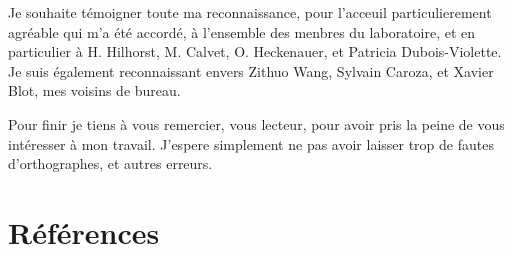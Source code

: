 \documentclass[a4paper,11pt]{article}
\theoremstyle{plain}
\theoremstyle{definition}
\theoremstyle{remark}
\numberwithin{equation}{section}
\numberwithin{equation}{subsection}
\numberwithin{figure}{section}
\begin{document}
Je souhaite témoigner toute ma reconnaissance, pour l'acceuil particulierement agréable qui m'a été accordé, à l'ensemble des menbres du 
laboratoire, et en particulier à H. Hilhorst, M. Calvet, O. Heckenauer, et Patricia Dubois-Violette. Je suis également 
reconnaissant envers Zithuo Wang, Sylvain Caroza, et Xavier Blot, mes voisins de bureau.

Pour finir je tiens à vous remercier, vous lecteur, pour avoir pris la peine de vous intéresser à mon travail. J'espere simplement ne pas avoir 
laisser trop de fautes d'orthographes, et autres erreurs. 

\section{Références}
\end{document}
